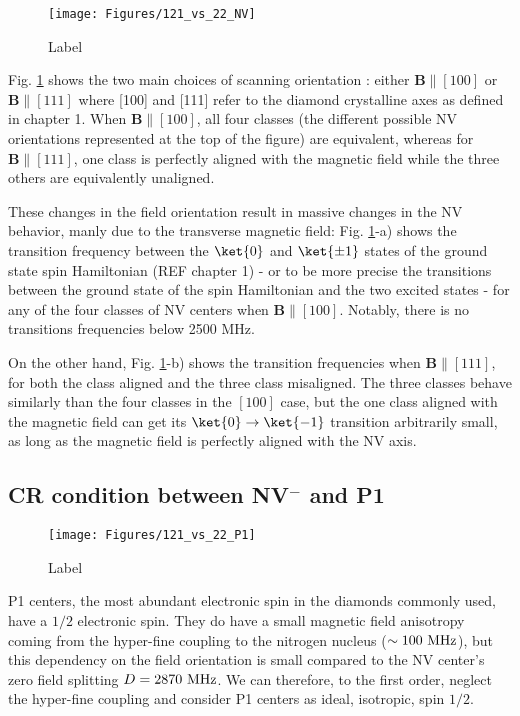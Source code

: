 \documentclass[a4paper]{report}
\begin{document}
\begin{figure}[h]
\centering
\texttt{[image: Figures/121\_vs\_22\_NV]}
\caption{Label}
\label{121 vs 22 NV}
\end{figure}

Fig. \ref{121 vs 22 NV} shows the two main choices of scanning orientation : either $\mathbf{B} \parallel [100]$ or 
$\mathbf{B} \parallel [111]$ where [100] and [111] refer to the diamond crystalline axes as defined in chapter 1. When $\mathbf{B} \parallel [100]$, all four classes (the different possible NV orientations represented at the top of the figure) are equivalent, whereas for $\mathbf{B} \parallel [111]$, one class is perfectly aligned with the magnetic field while the three others are equivalently unaligned. 

These changes in the field orientation result in massive changes in the NV behavior, manly due to the transverse magnetic field: Fig. \ref{121 vs 22 NV}-a) shows the transition frequency between the $\ket{0}$ and $\ket{\pm 1}$ states of the ground state spin Hamiltonian (REF chapter 1) - or to be more precise the transitions between the ground state of the spin Hamiltonian and the two excited states - for any of the four classes of NV centers when $\mathbf{B} \parallel [100]$. Notably, there is no transitions frequencies below 2500 MHz. 

On the other hand, Fig. \ref{121 vs 22 NV}-b) shows the transition frequencies when $\mathbf{B} \parallel [111]$, for both the class aligned and the three class misaligned. The three classes behave similarly than the four classes in the $[100]$ case, but the one class aligned with the magnetic field can get its $\ket{0}\to\ket{-1}$ transition arbitrarily small, as long as the magnetic field is perfectly aligned with the NV axis.

\subsection{CR condition between NV$^-$ and P1}

\begin{figure}[h]
\centering
\texttt{[image: Figures/121\_vs\_22\_P1]}
\caption{Label}
\label{121 vs 22 P1}
\end{figure}

P1 centers, the most abundant electronic spin in the diamonds commonly used, have a $1/2$ electronic spin. They do have a small magnetic field anisotropy coming from the hyper-fine coupling to the nitrogen nucleus ($\sim 100\ \rm MHz$), but this dependency on the field orientation is small compared to the NV center's zero field splitting $D=2870\ \rm MHz$. We can therefore, to the first order, neglect the hyper-fine coupling and consider P1 centers as ideal, isotropic, spin $1/2$.
\end{document}
